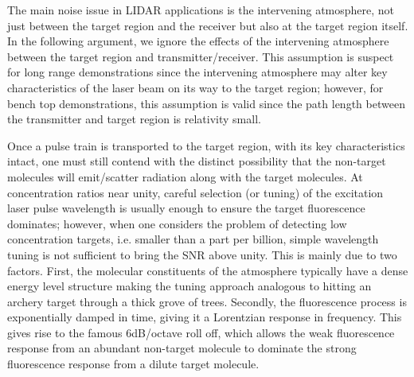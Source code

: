 The main noise issue in LIDAR applications is the intervening atmosphere, not just between the target region and the receiver but also at the target region itself. In the following argument, we ignore the effects of the intervening atmosphere between the target region and transmitter/receiver. This assumption is suspect for long range demonstrations since the intervening atmosphere may alter key characteristics of the laser beam on its way to the target region; however, for bench top demonstrations, this assumption is valid since the path length between the transmitter and target region is relativity small.

Once a pulse train is transported to the target region, with its key characteristics intact, one must still contend with the distinct possibility that the non-target molecules will emit/scatter radiation along with the target molecules. At concentration ratios near unity, careful selection (or tuning) of the excitation laser pulse wavelength is usually enough to ensure the target fluorescence dominates; however, when one considers the problem of detecting low concentration targets, i.e. smaller than a part per billion, simple wavelength tuning is not sufficient to bring the SNR above unity. This is mainly due to two factors. First, the molecular constituents of the atmosphere typically have a dense energy level structure making the tuning approach analogous to hitting an archery target through a thick grove of trees. Secondly, the fluorescence process is exponentially damped in time, giving it a Lorentzian response in frequency. This gives rise to the famous 6dB/octave roll off, which allows the weak fluorescence response from an abundant non-target molecule to dominate the strong fluorescence response from a dilute target molecule.


